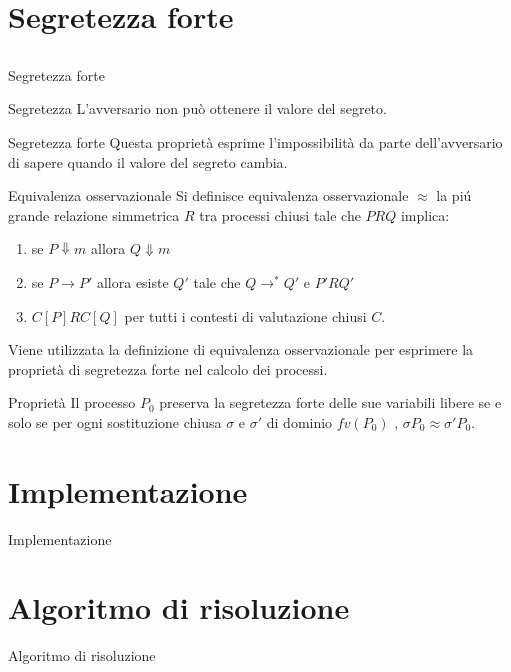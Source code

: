 \documentclass[12pt,xcolor=table]{beamer}
\begin{document}
\section{Segretezza forte}
\subsection{}
\begin{frame}{Segretezza forte}
    \begin{block}{Segretezza}
        L'avversario non può ottenere il valore del segreto.
    \end{block}
    \vspace{5mm}
    \begin{block}{Segretezza forte}
        Questa proprietà esprime l'impossibilità da parte dell'avversario di sapere quando il valore del segreto cambia.
    \end{block}
\end{frame}

\begin{frame}{Equivalenza osservazionale}
    Si definisce equivalenza osservazionale $\approx$ la piú grande relazione simmetrica $R$ tra processi chiusi tale che $PRQ$ implica:\\
    \begin{enumerate}
        \item se $P \Downarrow m$ allora $Q \Downarrow m$
        \item se $P \rightarrow P'$ allora esiste $Q'$ tale che $Q \rightarrow^* Q'$ e $P'RQ'$
        \item $C[P]RC[Q]$ per tutti i contesti di valutazione chiusi $C$.
    \end{enumerate}
\end{frame}

\begin{frame}{}
    \begin{block}{}
        Viene utilizzata la definizione di equivalenza osservazionale per esprimere la proprietà di segretezza forte nel calcolo dei processi.
    \end{block}
    
    \begin{block}{Proprietà}
        Il processo $P_0$ preserva la segretezza forte delle sue variabili libere se e solo se per ogni sostituzione chiusa $\sigma$ e $\sigma'$ di dominio $fv(P_0)$ , $\sigma P_0 \approx \sigma' P_0$.
    \end{block}
\end{frame}


\section{Implementazione}
\begin{frame}{Implementazione}

\end{frame}

\section{Algoritmo di risoluzione}
\begin{frame}{Algoritmo di risoluzione}
    
\end{frame}
\end{document}

